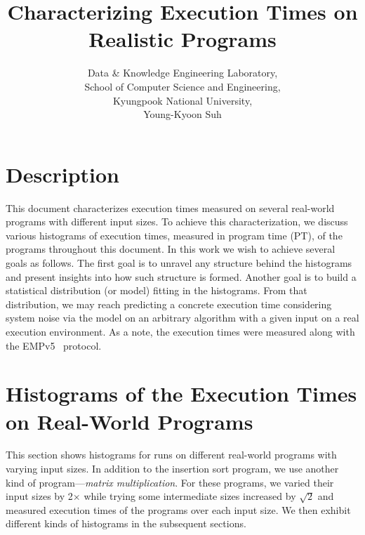 \documentclass[10pt]{article}
\begin{document}
\title{Characterizing Execution Times on Realistic Programs}

\author{
Data \& Knowledge Engineering Laboratory,\\
School of Computer Science and Engineering, \\
Kyungpook National University,\\
Young-Kyoon Suh\\
}
\maketitle

\section{Description}
This document characterizes execution times 
measured on several real-world programs with different input sizes. 
To achieve this characterization, we discuss 
various histograms of execution times, measured in program time (PT), of the programs throughout this document. 
In this work we wish to achieve several goals as follows. 
The first goal is to unravel any structure behind the histograms and present insights into how such structure is formed. 
Another goal is to build a statistical distribution (or model) fitting in the histograms. 
From that distribution, we may reach predicting a concrete execution time considering system noise via 
the model on an arbitrary algorithm with a given input on a real execution environment. 
As a note, the execution times were measured along with the EMPv5~\cite{EMP} protocol. 


\section{Histograms of the Execution Times on Real-World Programs~\label{sec:real-world}} 
This section shows histograms for runs on 
different real-world programs with varying input sizes.  
In addition to the insertion sort program, we use another kind of program---{\it matrix multiplication}.
For these programs, we varied their input sizes by 2{\small $\times$} while trying some intermediate sizes increased by $\sqrt{2}$ and measured execution times of the programs over each input size. We then exhibit different kinds of histograms in the subsequent sections.
\end{document}
